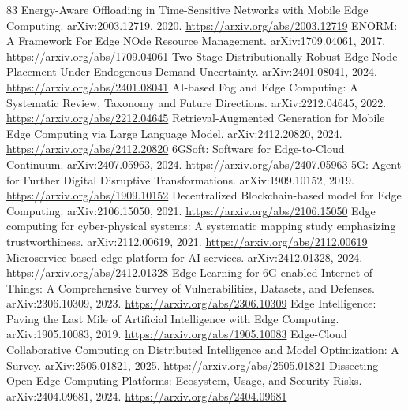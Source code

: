 \documentclass[11pt]{article}
\begin{document}
\begin{thebibliography}{83}
 Energy-Aware Offloading in Time-Sensitive Networks with Mobile Edge Computing. arXiv:2003.12719, 2020. \url{https://arxiv.org/abs/2003.12719}
 ENORM: A Framework For Edge NOde Resource Management. arXiv:1709.04061, 2017. \url{https://arxiv.org/abs/1709.04061}
 Two-Stage Distributionally Robust Edge Node Placement Under Endogenous Demand Uncertainty. arXiv:2401.08041, 2024. \url{https://arxiv.org/abs/2401.08041}
 AI-based Fog and Edge Computing: A Systematic Review, Taxonomy and Future Directions. arXiv:2212.04645, 2022. \url{https://arxiv.org/abs/2212.04645}
 Retrieval-Augmented Generation for Mobile Edge Computing via Large Language Model. arXiv:2412.20820, 2024. \url{https://arxiv.org/abs/2412.20820}
 6GSoft: Software for Edge-to-Cloud Continuum. arXiv:2407.05963, 2024. \url{https://arxiv.org/abs/2407.05963}
 5G: Agent for Further Digital Disruptive Transformations. arXiv:1909.10152, 2019. \url{https://arxiv.org/abs/1909.10152}
 Decentralized Blockchain-based model for Edge Computing. arXiv:2106.15050, 2021. \url{https://arxiv.org/abs/2106.15050}
 Edge computing for cyber-physical systems: A systematic mapping study emphasizing trustworthiness. arXiv:2112.00619, 2021. \url{https://arxiv.org/abs/2112.00619}
 Microservice-based edge platform for AI services. arXiv:2412.01328, 2024. \url{https://arxiv.org/abs/2412.01328}
 Edge Learning for 6G-enabled Internet of Things: A Comprehensive Survey of Vulnerabilities, Datasets, and Defenses. arXiv:2306.10309, 2023. \url{https://arxiv.org/abs/2306.10309}
 Edge Intelligence: Paving the Last Mile of Artificial Intelligence with Edge Computing. arXiv:1905.10083, 2019. \url{https://arxiv.org/abs/1905.10083}
 Edge-Cloud Collaborative Computing on Distributed Intelligence and Model Optimization: A Survey. arXiv:2505.01821, 2025. \url{https://arxiv.org/abs/2505.01821}
 Dissecting Open Edge Computing Platforms: Ecosystem, Usage, and Security Risks. arXiv:2404.09681, 2024. \url{https://arxiv.org/abs/2404.09681}
\end{thebibliography}
\end{document}
